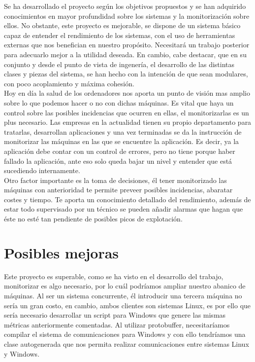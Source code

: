 \documentclass[ spanish, a4paper, 12pt, oneside]{report}
\begin{document}
Se ha desarrollado el proyecto según los objetivos propuestos y se han adquirido conocimientos en mayor profundidad sobre los sistemas y la monitorización sobre ellos. No obstante, este proyecto es mejorable, se dispone de un sistema básico capaz de entender el rendimiento de los sistemas, con el uso de herramientas externas que nos benefician en nuestro propósito. Necesitará un trabajo posterior 
para adecuarlo mejor a la utilidad deseada. En cambio, cabe destacar, que en su conjunto y desde el punto de vista de ingenería, el desarrollo de las distintas clases y piezas del sistema, se han hecho con la intención de que sean modulares, con poco acoplamiento y máxima cohesión. \\

Hoy en día la salud de los ordenadores nos aporta un punto de visión mas amplio sobre lo que podemos hacer o no con dichas máquinas. Es vital que haya un control sobre las posibles incidencias que ocurren en ellas, el monitorizarlas es un plus necesario. Las empresas en la actualidad tienen su propio departamento para tratarlas, desarrollan aplicaciones y una vez terminadas 
se da la instrucción de monitorizar las máquinas en las que se encuentre la aplicación. Es decir, ya la aplicación debe contar con un control de errores, pero no tiene porque haber fallado la aplicación, ante eso solo queda bajar un nivel y entender que está sucediendo internamente.\\

Otro factor importante es la toma de decisiones, él tener monitorizado las máquinas con anterioridad te permite preveer posibles incidencias, abaratar costes y tiempo. Te aporta un conocimiento detallado del rendimiento, además de estar todo supervisado por un técnico se pueden añadir alarmas que hagan que éste no esté tan pendiente de posibles picos de explotación.\\
\section{Posibles mejoras}

Este proyecto es superable, como se ha visto en el desarrollo del trabajo, monitorizar es algo necesario, por lo cuál podríamos ampliar nuestro abanico de máquinas. Al ser un sistema concurrente, él introducir una tercera máquina no sería un gran costo, en cambio, ambos clientes son sistemas Linux, es por ello que sería necesario desarrollar un script para Windows que 
genere las mismas métricas anteriormente comentadas. Al utilizar protobuffer, necesitaríamos compilar el sistema de comunicaciones para Windows y con ello tendríamos una clase autogenerada que nos permita realizar comunicaciones entre sistemas Linux y Windows.\\
\end{document}
